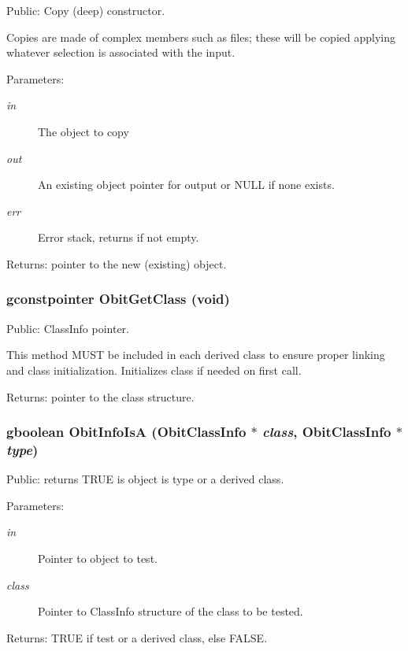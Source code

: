 Public: Copy (deep) constructor. 

Copies are made of complex members such as files; these will be copied applying whatever selection is associated with the input. \begin{Desc}
\item[Parameters:]
\begin{description}
\item[{\em in}]The object to copy \item[{\em out}]An existing object pointer for output or NULL if none exists. \item[{\em err}]Error stack, returns if not empty. \end{description}
\end{Desc}
\begin{Desc}
\item[Returns:]pointer to the new (existing) object. \end{Desc}
\subsubsection{\setlength{\rightskip}{0pt plus 5cm}gconstpointer Obit\-Get\-Class (void)}\label{Obit_8c_a5}


Public: Class\-Info pointer. 

This method MUST be included in each derived class to ensure proper linking and class initialization. Initializes class if needed on first call. \begin{Desc}
\item[Returns:]pointer to the class structure. \end{Desc}
\subsubsection{\setlength{\rightskip}{0pt plus 5cm}gboolean Obit\-Info\-Is\-A ({\bf Obit\-Class\-Info} $\ast$ {\em class}, {\bf Obit\-Class\-Info} $\ast$ {\em type})}\label{Obit_8c_a17}


Public: returns TRUE is object is type or a derived class. 

\begin{Desc}
\item[Parameters:]
\begin{description}
\item[{\em in}]Pointer to object to test. \item[{\em class}]Pointer to Class\-Info structure of the class to be tested. \end{description}
\end{Desc}
\begin{Desc}
\item[Returns:]TRUE if test or a derived class, else FALSE. \end{Desc}
